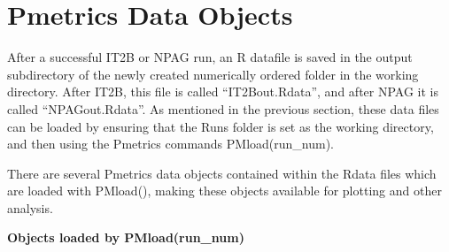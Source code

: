 \documentclass[
]{book}
\begin{document}
\hypertarget{pmetrics-data-objects}{%
\chapter{Pmetrics Data Objects}\label{pmetrics-data-objects}}

After a successful IT2B or NPAG run, an R datafile is saved in the
output subdirectory of the newly created numerically ordered folder in
the working directory. After IT2B, this file is called ``IT2Bout.Rdata'',
and after NPAG it is called ``NPAGout.Rdata''. As mentioned in the
previous section, these data files can be loaded by ensuring that the
Runs folder is set as the working directory, and then using the Pmetrics
commands PMload(run\_num).

There are several Pmetrics data objects contained within the Rdata files
which are loaded with PMload(), making these objects available for
plotting and other analysis.

\textbf{Objects loaded by PMload(run\_num)}
\end{document}
